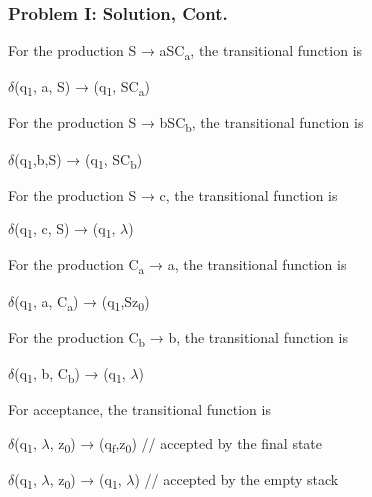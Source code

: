 \documentclass{beamer}
\begin{document}
\begin{frame}[fragile] %
	\frametitle{Problem I: Solution, Cont.}
	
For the production S → aSC\textsubscript{a}, the transitional function is


\begin{center}
	$\delta$(q\textsubscript{1}, a, S) → (q\textsubscript{1}, SC\textsubscript{a})
\end{center}

For the production S → bSC\textsubscript{b}, the transitional function is
\begin{center}
	$\delta$(q\textsubscript{1},b,S) → (q\textsubscript{1}, SC\textsubscript{b})
\end{center}

For the production  S → c, the transitional function is

\begin{center}
	$\delta$(q\textsubscript{1}, c, S) → (q\textsubscript{1}, $\lambda$)
\end{center}

For the production   C\textsubscript{a} → a, the transitional function is

\begin{center}
	$\delta$(q\textsubscript{1}, a, C\textsubscript{a}) → (q\textsubscript{1},Sz\textsubscript{0})
\end{center}
For the production    C\textsubscript{b} → b, the transitional function is

\begin{center}
	$\delta$(q\textsubscript{1}, b, C\textsubscript{b}) → (q\textsubscript{1}, $\lambda$)
\end{center}

For acceptance, the transitional function is
\begin{center}
	$\delta$(q\textsubscript{1}, $\lambda$, z\textsubscript{0}) → (q\textsubscript{f},z\textsubscript{0}) // accepted by the final state
\end{center}


\begin{center}
	$\delta$(q\textsubscript{1}, $\lambda$, z\textsubscript{0}) → (q\textsubscript{1}, $\lambda$)  // accepted by the empty stack
\end{center}

\end{frame}

\end{document}

